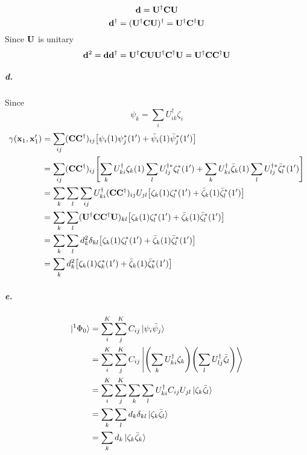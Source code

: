 \documentclass[a4paper]{article}
\newcommand{\subex}[1]{\subparagraph{#1}}
\numberwithin{equation}{subsection}
\begin{document}
\begin{equation}\label{key}
\vb{d} = \vb{U}^\dagger\vb{C}\vb{U} 
\end{equation}
\begin{equation}\label{key}
\vb{d}^\dagger = (\vb{U}^\dagger\vb{C}\vb{U} )^\dagger = \vb{U}^\dagger\vb{C}^\dagger\vb{U} 
\end{equation}
Since $ \vb{U} $ is unitary
\begin{equation}\label{key}
\vb{d}^2 = \vb{d}\vb{d}^\dagger = \vb{U}^\dagger\vb{C}\vb{U} \vb{U}^\dagger\vb{C}^\dagger\vb{U} = \vb{U}^\dagger\vb{C}\vb{C}^\dagger\vb{U}
\end{equation}
\subex{d.}
Since
\begin{equation}\label{key}
\psi_k = \sum_i U^\dagger_{ik} \zeta_i
\end{equation}
\begin{align}
\gamma(\vb{x}_1,\vb{x}'_1) &= \sum_{ij} (\vb{C}\vb{C}^\dagger)_{ij} \qty[\psi_i(1)\psi_j^*(1') 
+ \bar\psi_i(1)\bar\psi_j^*(1')] \notag\\
&=  \sum_{ij} (\vb{C}\vb{C}^\dagger)_{ij} \qty[\sum_k U^\dagger_{ki}\zeta_k(1)\sum_l U^{\dagger*}_{lj}\zeta_l^*(1')
+ \sum_k U^\dagger_{ki}\bar\zeta_k(1)\sum_l U^{\dagger*}_{lj}\bar\zeta_l^*(1')] \notag\\
&=  \sum_k\sum_l \sum_{ij} U^\dagger_{ki} (\vb{C}\vb{C}^\dagger)_{ij} U_{jl} \qty[\zeta_k(1) \zeta_l^*(1')
+ \bar\zeta_k(1)\bar\zeta_l^*(1')] \notag\\
&=  \sum_k\sum_l (\vb{U}^\dagger \vb{C}\vb{C}^\dagger \vb{U})_{kl} \qty[\zeta_k(1) \zeta_l^*(1')
+ \bar\zeta_k(1)\bar\zeta_l^*(1')] \notag\\
&=  \sum_k\sum_l d^2_k \delta_{kl} \qty[\zeta_k(1) \zeta_l^*(1')
+ \bar\zeta_k(1)\bar\zeta_l^*(1')] \notag\\
&= \sum_k d^2_k \qty[\zeta_k(1) \zeta_k^*(1')
+ \bar\zeta_k(1) \bar\zeta_k^*(1')] 
\end{align}
\subex{e.}
\begin{align}
\ket{^1\Phi_0} &= \sum_i^K \sum_j^K C_{ij} \ket{\psi_i\bar\psi_j} \notag\\
&= \sum_i^K \sum_j^K C_{ij} \Ket{ \qty(\sum_k U^\dagger_{ki} \zeta_k)\qty(\sum_l U^\dagger_{lj} \bar\zeta_l)} \notag\\
&= \sum_i^K \sum_j^K \sum_k\sum_l U^\dagger_{ki} C_{ij} U_{jl} \ket{ \zeta_k  \bar\zeta_l} \notag\\
&= \sum_k\sum_l d_{k}\delta_{kl} \ket{ \zeta_k  \bar\zeta_l} \notag\\
&= \sum_k d_{k} \ket{ \zeta_k  \bar\zeta_k}
\end{align}
\end{document}
